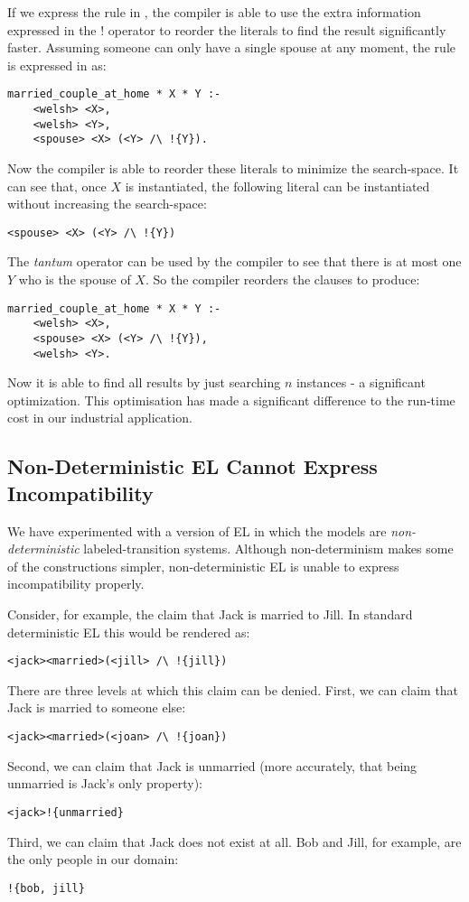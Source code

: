 If we express the rule in \ELFULL{}, the compiler is able to use the extra information expressed in the $!$ operator to reorder the literals to find the result significantly faster.
Assuming someone can only have a single spouse at any moment, the rule is expressed in \ELFULL{} as:
\begin{verbatim}
married_couple_at_home * X * Y :-
    <welsh> <X>,
    <welsh> <Y>,
    <spouse> <X> (<Y> /\ !{Y}).
\end{verbatim}	
Now the compiler is able to reorder these literals to minimize the search-space. 
It can see that, once $X$ is instantiated, the following literal can be instantiated without increasing the search-space:
\begin{verbatim}
<spouse> <X> (<Y> /\ !{Y})
\end{verbatim}
The \emph{tantum} operator can be used by the compiler to see that there is at most one $Y$ who is the spouse of $X$.
So the compiler reorders the clauses to produce:
\begin{verbatim}
married_couple_at_home * X * Y :-
    <welsh> <X>,
    <spouse> <X> (<Y> /\ !{Y}),
    <welsh> <Y>.
\end{verbatim}	
Now it is able to find all results by just searching $n$ instances - a significant optimization.
This optimisation has made a significant difference to the run-time cost in our industrial application.


\subsection{Non-Deterministic EL Cannot Express Incompatibility}

We have experimented with a version of EL in which the models are \emph{non-deterministic} labeled-transition systems.
Although non-determinism makes some of the constructions simpler, non-deterministic EL is unable to express incompatibility properly.

Consider, for example, the claim that Jack is married to Jill. 
In standard deterministic EL this would be rendered as:
\begin{verbatim}
<jack><married>(<jill> /\ !{jill})
\end{verbatim}
There are three levels at which this claim can be denied.
First, we can claim that Jack is married to someone else:
\begin{verbatim}
<jack><married>(<joan> /\ !{joan})
\end{verbatim}
Second, we can claim that Jack is unmarried (more accurately, that being unmarried is Jack's only property):
\begin{verbatim}
<jack>!{unmarried}
\end{verbatim}
Third, we can claim that Jack does not exist at all. Bob and Jill, for example, are the only people in our domain:
\begin{verbatim}
!{bob, jill}
\end{verbatim}

